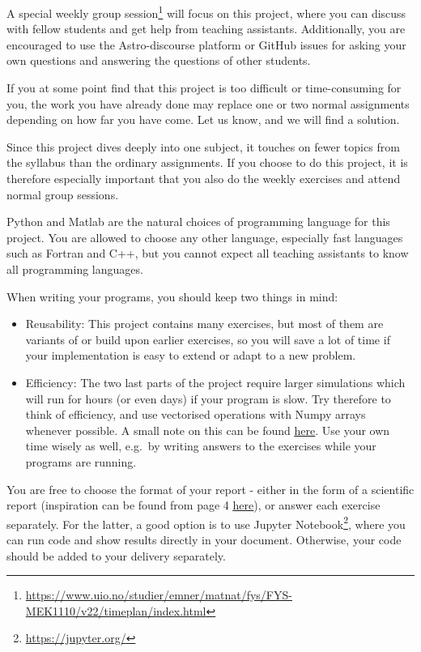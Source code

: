 \documentclass[11pt,british,a4paper]{report}
\begin{document}
A special weekly group session\footnote{\url{https://www.uio.no/studier/emner/matnat/fys/FYS-MEK1110/v22/timeplan/index.html}} will focus on this project, where you can discuss with fellow students and get help from teaching assistants. Additionally, you are encouraged to use the Astro-discourse platform or GitHub issues for asking your own questions and answering the questions of other students.

If you at some point find that this project is too difficult or time-consuming for you, the work you have already done may replace one or two normal assignments depending on how far you have come. Let us know, and we will find a solution.

Since this project dives deeply into one subject, it touches on fewer topics from the syllabus than the ordinary assignments. If you choose to do this project, it is therefore especially important that you also do the weekly exercises and attend normal group sessions.

Python and Matlab are the natural choices of programming language for this project. You are allowed to choose any other language, especially fast languages such as Fortran and C++, but you cannot expect all teaching assistants to know all programming languages.

When writing your programs, you should keep two things in mind:
\begin{itemize}
    \item Reusability: This project contains many exercises, but most of them are variants of or build upon earlier exercises, so you will save a lot of time if your implementation is easy to extend or adapt to a new problem.
    \item Efficiency: The two last parts of the project require larger simulations which will run for hours (or even days) if your program is slow. Try therefore to think of efficiency, and use vectorised operations with Numpy arrays whenever possible. A small note on this can be found \href{https://github.com/uio-fys-mek/md-prosjekt/blob/master/vektorisering.ipynb}{\underline{here}}. Use your own time wisely as well, e.g.\ by writing answers to the exercises while your programs are running.
\end{itemize}

You are free to choose the format of your report - either in the form of a scientific report (inspiration can be found from page 4 \href{http://compphysics.github.io/ComputationalPhysics/doc/pub/projectwriting/pdf/projectwriting-print.pdf}{\underline{here}}), or answer each exercise separately. For the latter, a good option is to use Jupyter Notebook\footnote{\url{https://jupyter.org/}}, where you can run code and show results directly in your document. Otherwise, your code should be added to your delivery separately. 
\end{document}
